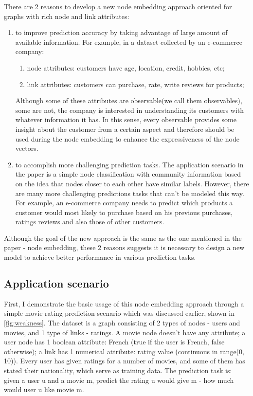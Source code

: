 \documentclass{article}
\begin{document}
There are 2 reasons to develop a new node embedding approach oriented for graphs with rich node and link attributes:
\begin{enumerate}
	\item to improve prediction accuracy by taking advantage of large amount of available information. For example, in a dataset collected by an e-commerce company:
	\begin{enumerate}
		\item node attributes: customers have age, location, credit, hobbies, etc;
		\item link attributes: customers can purchase, rate, write reviews for products;
	\end{enumerate}
	Although some of these attributes are observable(we call them observables), some are not, the company is interested in understanding its customers with whatever information it has. In this sense, every observable provides some insight about the customer from a certain aspect and therefore should be used during the node embedding to enhance the expressiveness of the node vectors.
	\item to accomplish more challenging prediction tasks. The application scenario in the paper is a simple node classification with community information based on the idea that nodes closer to each other have similar labels. However, there are many more challenging predictions tasks that can't be modeled this way. For example, an e-commerce company needs to predict which products a customer would most likely to purchase based on his previous purchases, ratings reviews and also those of other customers.
\end{enumerate}
Although the goal of the new approach is the same as the one mentioned in the paper - node embedding, these 2 reasons suggests it is necessary to design a new model to achieve better performance in various prediction tasks.

\subsection{Application scenario}

First, I demonstrate the basic usage of this node embedding approach through a simple movie rating prediction scenario which was discussed earlier, shown in \autoref{fig:weakness}. The dataset is a graph consisting of 2 types of nodes - users and movies, and 1 type of links - ratings. A movie node doesn't have any attribute; a user node has 1 boolean attribute: French (true if the user is French, false otherwise); a link has 1 numerical attribute: rating value (continuous in range(0, 10)). Every user has given ratings for a number of movies, and some of them has stated their nationality, which serve as training data. The prediction task is: given a user u and a movie m, predict the rating u would give m - how much would user u like movie m.
\end{document}
